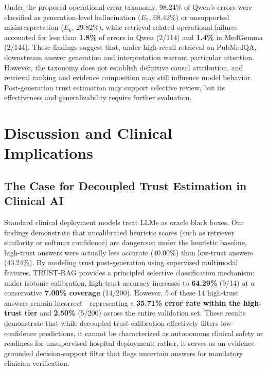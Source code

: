 \documentclass[journal,10pt]{IEEEtran}
\begin{document}
Under the proposed operational error taxonomy, 98.24\% of Qwen's errors were classified as generation-level hallucination ($E_5$, 68.42\%) or unsupported misinterpretation ($E_6$, 29.82\%), while retrieval-related operational failures accounted for less than \textbf{1.8\%} of errors in Qwen (2/114) and \textbf{1.4\%} in MedGemma (2/144). These findings suggest that, under high-recall retrieval on PubMedQA, downstream answer generation and interpretation warrant particular attention. However, the taxonomy does not establish definitive causal attribution, and retrieval ranking and evidence composition may still influence model behavior. Post-generation trust estimation may support selective review, but its effectiveness and generalizability require further evaluation.

\section{Discussion and Clinical Implications}
\subsection{The Case for Decoupled Trust Estimation in Clinical AI}
Standard clinical deployment models treat LLMs as oracle black boxes. Our findings demonstrate that uncalibrated heuristic scores (such as retriever similarity or softmax confidence) are dangerous: under the heuristic baseline, high-trust answers were actually less accurate (40.00\%) than low-trust answers (43.24\%). By modeling trust post-generation using supervised multimodal features, TRUST-RAG provides a principled selective classification mechanism: under isotonic calibration, high-trust accuracy increases to \textbf{64.29\%} (9/14) at a conservative \textbf{7.00\% coverage} (14/200). However, 5 of these 14 high-trust answers remain incorrect---representing a \textbf{35.71\% error rate within the high-trust tier} and \textbf{2.50\%} (5/200) across the entire validation set. These results demonstrate that while decoupled trust calibration effectively filters low-confidence predictions, it cannot be characterized as autonomous clinical safety or readiness for unsupervised hospital deployment; rather, it serves as an evidence-grounded decision-support filter that flags uncertain answers for mandatory clinician verification.
\end{document}
